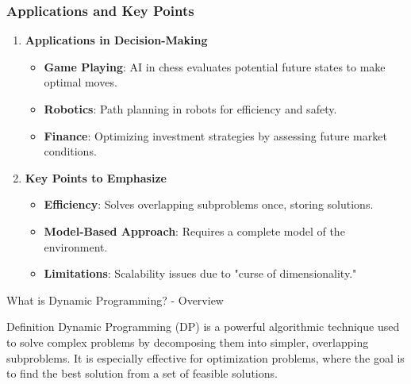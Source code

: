 \documentclass[aspectratio=169]{beamer}
\begin{document}
\begin{frame}[fragile]
    \frametitle{Applications and Key Points}
    \begin{enumerate}
        \item \textbf{Applications in Decision-Making}
            \begin{itemize}
                \item \textbf{Game Playing}: AI in chess evaluates potential future states to make optimal moves.
                \item \textbf{Robotics}: Path planning in robots for efficiency and safety.
                \item \textbf{Finance}: Optimizing investment strategies by assessing future market conditions.
            \end{itemize}
        \item \textbf{Key Points to Emphasize}
            \begin{itemize}
                \item \textbf{Efficiency}: Solves overlapping subproblems once, storing solutions.
                \item \textbf{Model-Based Approach}: Requires a complete model of the environment.
                \item \textbf{Limitations}: Scalability issues due to "curse of dimensionality."
            \end{itemize}
    \end{enumerate}
\end{frame}

\begin{frame}[fragile]{What is Dynamic Programming? - Overview}
    \begin{block}{Definition}
        Dynamic Programming (DP) is a powerful algorithmic technique used to solve complex problems by decomposing them into simpler, overlapping subproblems. It is especially effective for optimization problems, where the goal is to find the best solution from a set of feasible solutions.
    \end{block}
\end{frame}
\end{document}
